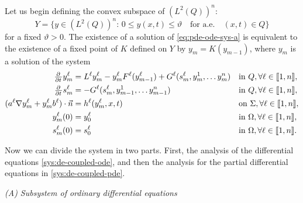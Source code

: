 \documentclass[11pt]{article}
\newcommand{\llb}{\llbracket}
\newcommand{\rrb}{\rrbracket}
\numberwithin{equation}{section}
\begin{document}
Let us begin defining the convex subspace of \((L^2 (Q))^n\):
\[
	Y = \big\{ y \in	(L^2 (Q))^n:\, 	%
	0 \leq y(x,t) \leq \vartheta \quad\text{for a.e.}\quad (x,t) \in Q \big\}
\]
for a fixed \(\vartheta > 0\).
%
The existence of a solution of \eqref{eq:pde-ode-sys-a} is equivalent to the existence
of a fixed point of \(K\) defined on 
\(Y\) %
%
%
%
%
by \( y_m = K(y_{m-1}) \), where \(y_m\) is a solution of the system
\begin{subequations}
\label{sys:de-coupled}
\begin{align}
	\pd{ }{t} y_m^\ell &= L^\ell y_m^\ell - y^\ell_m F^\ell(y_{m-1}^\ell) + G^\ell(s_m^\ell,y_{m}^1,\ldots y_{m}^n) 		&& \text{in } Q, \forall \ell \in \llb 1,n\rrb,
	\label{sys:de-coupled-pde}
	\\
	\pd{ }{t} s_m^\ell &= -G^\ell(s_m^\ell,y_{m-1}^1,\ldots y_{m-1}^n)				&& \text{in } Q,\forall \ell \in \llb 1,n\rrb,
	\label{sys:de-coupled-ode}
	\\
	 (a^\ell  \nabla y_m^\ell + y_m^\ell b^\ell) \cdot \vec{n} &= h^\ell (y_{m}^\ell, x,t)	&& \text{on } \Sigma,\forall \ell \in \llb 1,n\rrb,
	 \label{sys:de-coupled-pde-b}
	 \\
	 y_m^\ell(0) &= y^\ell_{0}			 && \text{in } \Omega, \forall \ell \in \llb 1,n\rrb,
	 \label{sys:de-coupled-pde-i}
	 \\
	 s_m^\ell(0) &= s^\ell_{0}			 && \text{in } \Omega, \forall \ell \in \llb 1,n\rrb.
	 \label{sys:de-coupled-ode-i}
\end{align}
\end{subequations}

Now we can divide the system in two parts. First, the analysis of the differential equations \eqref{sys:de-coupled-ode}, and then the analysis for the partial differential equations in \eqref{sys:de-coupled-pde}.

\vspace{1\baselineskip}
\noindent\emph{(A) Subsystem of ordinary differential equations}
\vspace{0.5\baselineskip}
\end{document}
